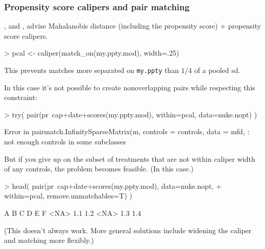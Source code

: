 \begin{frame}[fragile]
  \frametitle{Propensity score calipers and pair matching}
\citet{rosenbaum:rubi:1985a}, and \citet{rubin:thom:2000}, advise Mahalanobis distance (including the propensity score) + propensity score calipers.
\begin{Schunk}
\begin{Sinput}
> pcal <-  caliper(match_on(my.ppty.mod), width=.25)
\end{Sinput}
\end{Schunk}
\pause %

This prevents matches more separated on \texttt{my.ppty} than $1/4$ of
a pooled sd.  \pause 

In this case it's not possible to create nonoverlapping
pairs while respecting this constraint: {%
\begin{Schunk}
\begin{Sinput}
> try( pair(pr~cap+date+scores(my.ppty.mod), within=pcal, data=nuke.nopt) )
\end{Sinput}
\end{Schunk}
\begin{Schunk}
\begin{Soutput}
Error in pairmatch.InfinitySparseMatrix(m, controls = controls, data = mfd,  : 
  not enough controls in some subclasses
\end{Soutput}
\end{Schunk}
}
\pause
But if you give up on the subset of
treatments that are not within caliper width of any controls, the problem becomes feasible. (In this case.) {%
\begin{Schunk}
\begin{Sinput}
> head( pair(pr~cap+date+scores(my.ppty.mod), data=nuke.nopt,
+                within=pcal, remove.unmatchables=T) )
\end{Sinput}
\begin{Soutput}
   A    B    C    D    E    F 
<NA>  1.1  1.2 <NA>  1.3  1.4 
\end{Soutput}
\end{Schunk}
\pause 
(This doesn't always work.  More general solutions include widening the caliper and matching more flexibly.) } %
\end{frame}


